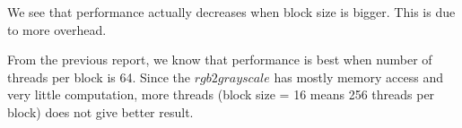 \documentclass[14pt]{article}
\begin{document}
We see that performance actually decreases when block size is bigger. This is due to more overhead.

From the previous report, we know that performance is best when number of threads per block is 64. Since the $rgb2grayscale$ has mostly memory access and very little computation, more threads (block size = 16 means 256 threads per block) does not give better result.
\end{document}
